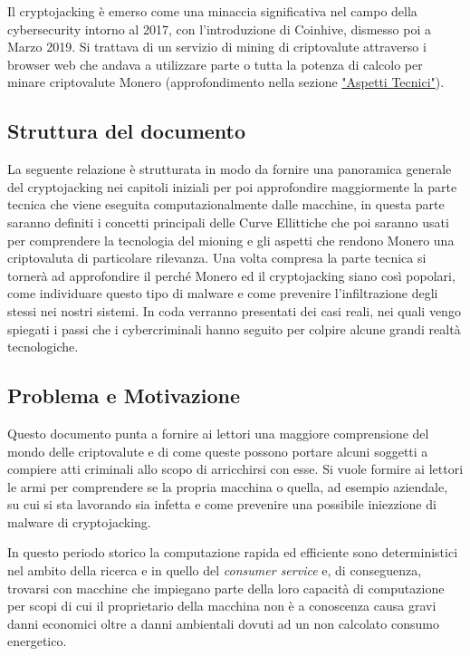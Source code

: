 \documentclass[12pt,a4paper]{article}
\begin{document}
Il cryptojacking è emerso come una minaccia significativa nel campo della
cybersecurity intorno al 2017, con l'introduzione di Coinhive, dismesso poi a
Marzo 2019. Si trattava di un servizio di mining di criptovalute attraverso i browser web 
che andava a utilizzare parte o tutta la potenza di calcolo per minare
criptovalute Monero (approfondimento nella sezione
\hyperref[sec:aspetti_tecnici]{"Aspetti Tecnici"}). 

\subsection{Struttura del documento}
La seguente relazione è strutturata in modo da fornire una panoramica generale
del cryptojacking nei capitoli iniziali per poi approfondire maggiormente la
parte tecnica che viene eseguita computazionalmente dalle macchine, in questa
parte saranno definiti i concetti principali delle Curve Ellittiche che poi
saranno usati per comprendere la tecnologia del mioning e gli aspetti che
rendono Monero una criptovaluta di particolare rilevanza. Una volta compresa la
parte tecnica si tornerà ad approfondire il perché Monero ed il cryptojacking
siano così popolari, come individuare questo tipo di malware e come prevenire
l'infiltrazione degli stessi nei nostri sistemi. In coda verranno presentati dei
casi reali, nei quali vengo spiegati i passi che i cybercriminali hanno seguito
per colpire alcune grandi realtà tecnologiche.

\subsection{Problema e Motivazione}
Questo documento punta a fornire ai lettori una maggiore comprensione del mondo
delle criptovalute e di come queste possono portare alcuni soggetti a compiere
atti criminali allo scopo di arricchirsi con esse. Si vuole formire ai lettori
le armi per comprendere se la propria macchina o quella, ad esempio aziendale,
su cui si sta lavorando sia infetta e come prevenire una possibile iniezzione di
malware di cryptojacking.

In questo periodo storico la computazione rapida ed efficiente sono
deterministici nel ambito della ricerca e in quello del \textit{consumer
service} e, di conseguenza, trovarsi con macchine che impiegano parte della loro
capacità di computazione per scopi di cui il proprietario della macchina non è a
conoscenza causa gravi danni economici oltre a danni ambientali dovuti ad un non
calcolato consumo energetico.
\end{document}
